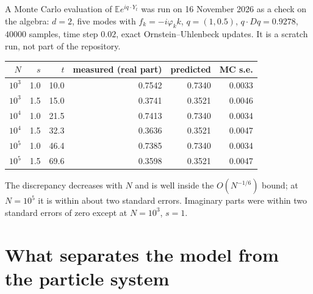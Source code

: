 \documentclass[11pt]{article}
\newcommand{\E}{\mathbb{E}}
\theoremstyle{remark}
\begin{document}
A Monte Carlo evaluation of $\E e^{iq\cdot Y_t}$ was run on
16 November 2026 as a check on the algebra: $d=2$, five modes with
$f_k = -i\varphi_k k$, $q = (1,0.5)$, $q\cdot Dq = 0.9278$, $40000$ samples,
time step $0.02$, exact Ornstein--Uhlenbeck updates. It is a scratch run, not
part of the repository.
\begin{center}
\begin{tabular}{rrrrrr}
  $N$ & $s$ & $t$ & measured (real part) & predicted & MC s.e. \\ \hline
  $10^3$ & 1.0 & 10.0 & 0.7542 & 0.7340 & 0.0033 \\
  $10^3$ & 1.5 & 15.0 & 0.3741 & 0.3521 & 0.0046 \\
  $10^4$ & 1.0 & 21.5 & 0.7413 & 0.7340 & 0.0034 \\
  $10^4$ & 1.5 & 32.3 & 0.3636 & 0.3521 & 0.0047 \\
  $10^5$ & 1.0 & 46.4 & 0.7385 & 0.7340 & 0.0034 \\
  $10^5$ & 1.5 & 69.6 & 0.3598 & 0.3521 & 0.0047 \\
\end{tabular}
\end{center}
The discrepancy decreases with $N$ and is well inside the $O(N^{-1/6})$
bound; at $N = 10^5$ it is within about two standard errors. Imaginary parts
were within two standard errors of zero except at $N=10^3$, $s=1$.

\section{What separates the model from the particle system}
\label{sec:gap}
\end{document}
